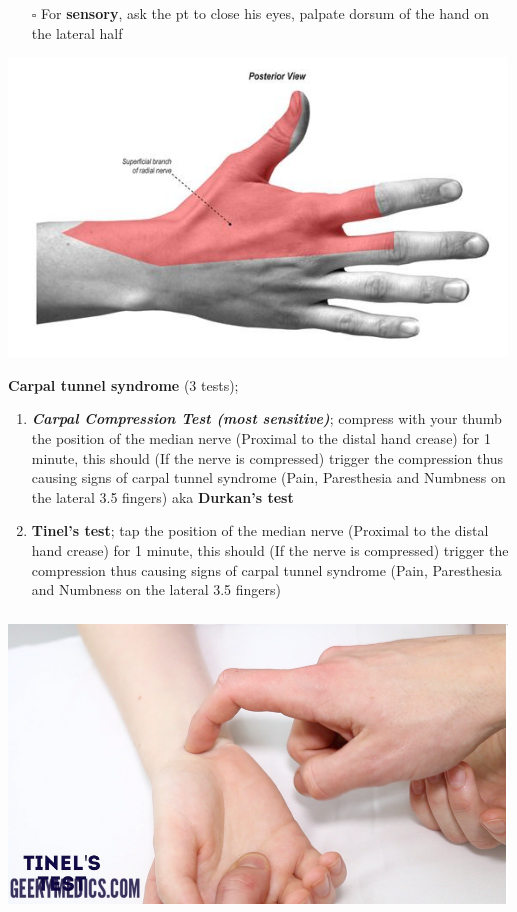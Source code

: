 \documentclass[
  13.5pt,
  a4paper,
  DIV=11,
  numbers=noendperiod]{scrreprt}
\providecommand{\tightlist}{%
  \setlength{\itemsep}{0pt}\setlength{\parskip}{0pt}}
\begin{document}
\begin{itemize}
\tightlist
\item[$\square$]
  For \textbf{sensory}, ask the pt to close his eyes, palpate dorsum of
  the hand on the lateral half
\end{itemize}

\includegraphics[width=5.20833in,height=3.125in]{mss5.png}

\textbf{Carpal tunnel syndrome} (3 tests);

\begin{enumerate}
\def\labelenumi{\arabic{enumi})}
\item
  \textbf{\emph{Carpal Compression Test (most sensitive)}}; compress
  with your thumb the position of the median nerve (Proximal to the
  distal hand crease) for 1 minute, this should (If the nerve is
  compressed) trigger the compression thus causing signs of carpal
  tunnel syndrome (Pain, Paresthesia and Numbness on the lateral 3.5
  fingers) aka \textbf{Durkan's test}
\item
  \textbf{Tinel's test}; tap the position of the median nerve (Proximal
  to the distal hand crease) for 1 minute, this should (If the nerve is
  compressed) trigger the compression thus causing signs of carpal
  tunnel syndrome (Pain, Paresthesia and Numbness on the lateral 3.5
  fingers)
\end{enumerate}

\includegraphics[width=5.20833in,height=3.125in]{mss6.png}
\end{document}
